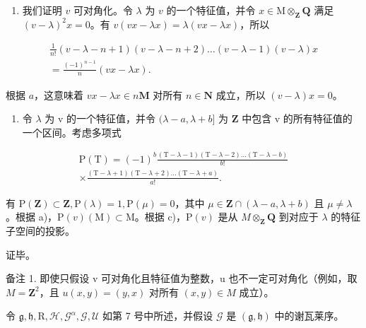 \begin{enumerate}
\def\labelenumi{\alph{enumi})}
\setcounter{enumi}{2}
\tightlist
\item
  我们证明 \(v\) 可对角化。令 \(\lambda\) 为 \(v\) 的一个特征值，并令 \(x \in \mathrm{M} \otimes_{\mathbf{Z}} \mathbf{Q}\) 满足 \((v - \lambda)^2 x = 0\)。有 \(v(vx - \lambda x) = \lambda(vx - \lambda x)\)，所以
\end{enumerate}

\[
\begin{array}{c} \frac {1}{n !} (v - \lambda - n + 1) (v - \lambda - n + 2) \ldots (v - \lambda - 1) (v - \lambda) x \\ = \frac {(- 1) ^ {n - 1}}{n} (v x - \lambda x). \end{array}
\]

根据 \(a\)，这意味着 \(vx - \lambda x \in n\mathbf{M}\) 对所有 \(n \in \mathbf{N}\) 成立，所以 \((v - \lambda)x = 0\)。

\begin{enumerate}
\def\labelenumi{\alph{enumi})}
\setcounter{enumi}{3}
\tightlist
\item
  令 \(\lambda\) 为 v 的一个特征值，并令 \((\lambda - a, \lambda + b]\) 为 \(\mathbf{Z}\) 中包含 v 的所有特征值的一个区间。考虑多项式
\end{enumerate}

\[
\begin{array}{c} \mathrm{P(T)} = (- 1) ^ {b} \frac {(\mathrm{T} - \lambda - 1) (\mathrm{T} - \lambda - 2) \ldots (\mathrm{T} - \lambda - b)}{b !} \\ \times \frac {(\mathrm{T} - \lambda + 1) (\mathrm{T} - \lambda + 2) \ldots (\mathrm{T} - \lambda + a)}{a !}. \end{array}
\]

有 \(\mathrm{P}(\mathbf{Z})\subset\mathbf{Z},\mathrm{P}(\lambda)=1,\mathrm{P}(\mu)=0\)，其中 \(\mu\in\mathbf{Z}\cap(\lambda-a,\lambda+b)\) 且 \(\mu\neq\lambda\)。根据 a)，\(\mathrm{P}(v)(\mathrm{M})\subset\mathrm{M}\)。根据 c)，\(\mathrm{P}(v)\) 是从 \(M\otimes_{\mathbf{Z}}\mathbf{Q}\) 到对应于 \(\lambda\) 的特征子空间的投影。

证毕。

备注 1. 即使只假设 v 可对角化且特征值为整数，u 也不一定可对角化（例如，取 \(M = \mathbf{Z}^{2}\)，且 \(u(x, y) = (y, x)\) 对所有 \((x, y) \in M\) 成立）。

令 \(\mathfrak{g},\mathfrak{h},\mathrm{R},\mathcal{H},\mathcal{G}^{\alpha},\mathcal{G},\mathcal{U}\) 如第 7 号中所述，并假设 \(\mathcal{G}\) 是 \((\mathfrak{g},\mathfrak{h})\) 中的谢瓦莱序。

